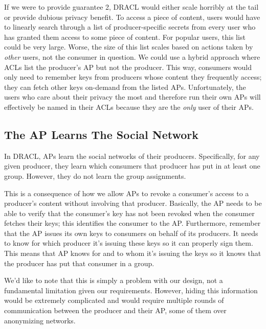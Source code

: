 \documentclass[pdftex,12pt,a4papaer,twoside,notitlepage]{report}
\begin{document}
If we were to provide guarantee 2, DRACL would either scale horribly at the tail
or provide dubious privacy benefit. To access a piece of content, users would
have to linearly search through a list of producer-specific secrets from every user
who has granted them access to some piece of content. For popular users, this
list could be very large. Worse, the size of this list scales based on actions
taken by \emph{other} users, not the consumer in question. We could use a hybrid
approach where ACLs list the producer's AP but not the producer. This
way, consumers would only need to remember keys from producers whose
content they frequently access; they can fetch other keys on-demand from the
listed APs. Unfortunately, the users who care about their privacy the most and
therefore run their own APs will effectively be named in their ACLs because they
are the \emph{only} user of their APs.

\subsection{The AP Learns The Social Network}

In DRACL, APs learn the social networks of their producers. Specifically,
for any given producer, they learn which consumers that producer has put in at
least one group. However, they do not learn the group assignments.

This is a consequence of how we allow APs to revoke a consumer's access to a
producer's content without involving that producer. Basically, the AP needs to
be able to verify that the consumer's key has not been revoked when the consumer
fetches their keys; this identifies the consumer to the AP. Furthermore,
remember that the AP issues its own keys to consumers on behalf of its
producers. It needs to know for which producer it's issuing these keys so it can
properly sign them. This means that AP knows for and to whom it's issuing the
keys so it knows that the producer has put that consumer in a group.

We'd like to note that this is simply a problem with our design, not a
fundamental limitation given our requirements. However, hiding this information
would be extremely complicated and would require multiple rounds of
communication between the producer and their AP, some of them over anonymizing
networks.
\end{document}
